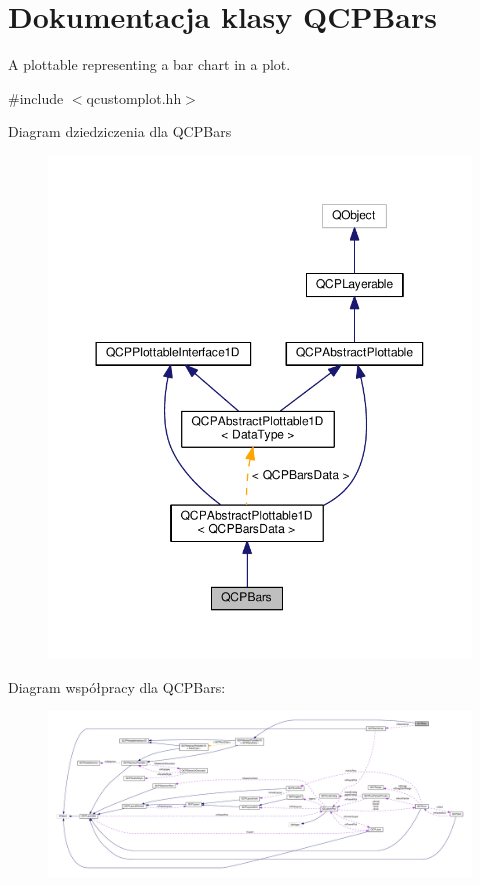 \hypertarget{class_q_c_p_bars}{}\section{Dokumentacja klasy Q\+C\+P\+Bars}
\label{class_q_c_p_bars}


A plottable representing a bar chart in a plot.  




{\ttfamily \#include $<$qcustomplot.\+hh$>$}



Diagram dziedziczenia dla Q\+C\+P\+Bars\nopagebreak
\begin{figure}[H]
\begin{center}
\leavevmode
\includegraphics[width=350pt]{class_q_c_p_bars__inherit__graph}
\end{center}
\end{figure}


Diagram współpracy dla Q\+C\+P\+Bars\+:\nopagebreak
\begin{figure}[H]
\begin{center}
\leavevmode
\includegraphics[width=350pt]{class_q_c_p_bars__coll__graph}
\end{center}
\end{figure}
